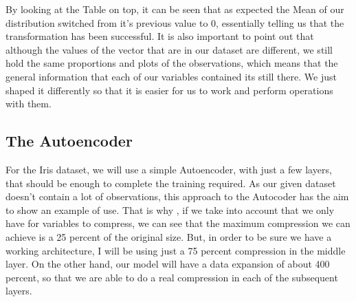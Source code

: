 \documentclass[12pt]{report}
\begin{document}
By looking at the Table on top, it can be seen that as expected the Mean of our distribution switched from it's previous value to 0, essentially telling us that the transformation has been successful. It is also important to point out that although the values of the vector that are in our dataset are different, we still hold the same proportions and plots of the observations, which means that the general information that each of our variables contained its still there. We just shaped it differently so that it is easier for us to work and perform operations with them.

\subsection{The Autoencoder}

For the Iris dataset, we will use a simple Autoencoder, with just a few layers, that should be enough to complete the training required. As our given dataset doesn't contain a lot of observations, this approach to the Autocoder has the aim to show an example of use. That is why , if we take into account that we only have for variables to compress, we can see that the maximum compression we can achieve is a 25 percent of the original size. But, in order to be sure we have a working architecture, I will be using just a 75 percent compression in the middle layer. On the other hand, our model will have a data expansion of about 400 percent, so that we are able to do a real compression in each of the subsequent layers. \par
\end{document}
